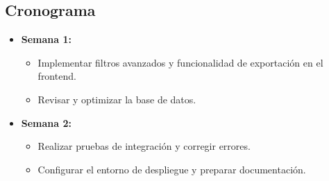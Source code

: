 \subsection*{Cronograma}
\begin{itemize}
    \item \textbf{Semana 1:}
    \begin{itemize}
        \item Implementar filtros avanzados y funcionalidad de exportación en el frontend.
        \item Revisar y optimizar la base de datos.
    \end{itemize}
    \item \textbf{Semana 2:}
    \begin{itemize}
        \item Realizar pruebas de integración y corregir errores.
        \item Configurar el entorno de despliegue y preparar documentación.
    \end{itemize}
\end{itemize}
